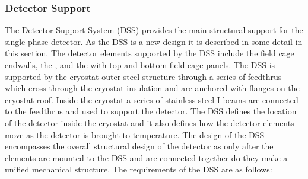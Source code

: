 \subsubsection{Detector Support}

The Detector Support System (DSS) provides the main structural support
for the single-phase detector.  As the DSS is a new design it is described in some detail in this section. The detector elements supported by the
DSS include the field cage endwalls, the , and
the  with top and bottom field cage panels.  The DSS is
supported by the cryostat outer steel structure through a series of
feedthrus which cross through the cryostat insulation and are anchored
with flanges on the cryostat roof. Inside the cryostat a series of
stainless steel I-beams are connected to the feedthrus and used to
support the detector. The DSS defines the location of the detector
inside the cryostat and it also defines how the detector elements move
as the detector is brought to  temperature. The design of the DSS
encompasses the overall structural design of the detector as only
after the elements are mounted to the DSS and are connected together
do they make a unified mechanical structure. The requirements of the
DSS are as follows:
